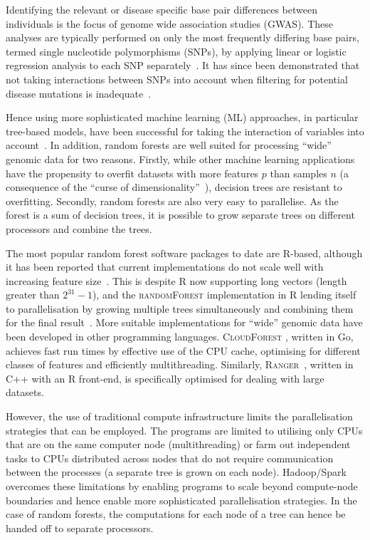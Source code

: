 \documentclass[10pt,letterpaper]{article}
\newcommand{\ranger}{\textsc{Ranger}\xspace}
\newcommand{\randomforest}{\textsc{randomForest}\xspace}
\begin{document}
Identifying the relevant or disease specific base pair differences between individuals is the focus of genome wide
association studies (GWAS).  These analyses are typically performed on only the most frequently differing base pairs,
termed single nucleotide polymorphisms (SNPs), by applying linear or logistic regression analysis to each SNP
separately~\cite{CCC2007}.  It has since been demonstrated that not taking interactions between SNPs into account
when filtering for potential disease mutations is inadequate~\cite{Manolio2009,Yang2011}.

Hence using more sophisticated machine learning (ML) approaches, in particular tree-based models, have been successful
for taking the interaction of variables into account~\cite{Wright.et.al.2016}. In addition, random forests are well
suited for processing ``wide'' genomic data for two reasons.  Firstly, while other machine learning applications have
the propensity to overfit datasets with more features $p$ than samples $n$ (a consequence of the ``curse of
dimensionality''~\cite{Bauer2014, bellman1961adaptive}), decision trees are resistant to overfitting.  Secondly, random
forests are also very easy to parallelise. As the forest is a sum of decision trees, it is possible to grow separate
trees on different processors and combine the trees. 

The most popular random forest software packages to date are R-based, although it has been reported that current implementations 
do not scale well with increasing feature size~\cite{Wright.and.Ziegle.2016}.  This is despite R now supporting long vectors (length greater
than $2^{31}-1$), and the \randomforest implementation in R lending itself to parallelisation by growing multiple
trees simultaneously and combining them for the final result~\cite{Liaw.and.Weiner.2002}.  More suitable implementations for ``wide''
genomic data have been developed in other programming languages. \textsc{CloudForest} \cite{Bressler2015}, written in Go,
achieves fast run times by effective use of the CPU cache, optimising for different classes of features and efficiently
multithreading.  Similarly, \ranger~\cite{Wright.and.Ziegle.2016}, written in C++ with an R front-end, is
specifically optimised for dealing with large datasets.

However, the use of traditional compute infrastructure limits the parallelisation strategies that can be employed.  
The programs are limited to utilising only CPUs that are on the same computer node (multithreading) or
farm out independent tasks to CPUs distributed across nodes that do not require communication between the
processes (a separate tree is grown on each node).
Hadoop/Spark overcomes these limitations by enabling programs to
scale beyond compute-node boundaries and hence enable more sophisticated parallelisation strategies.  In the case of
random forests, the computations for each node of a tree can hence be handed off to separate processors.
 
\end{document}
